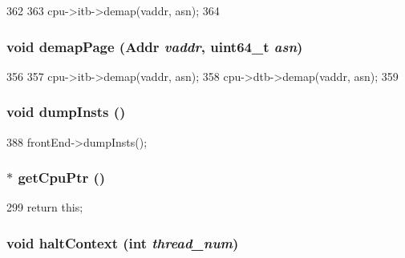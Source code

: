 \begin{DoxyCode}
362     {
363         cpu->itb->demap(vaddr, asn);
364     }
\end{DoxyCode}
\hypertarget{classOzoneCPU_a2d698ff909513b48a1263f8a5440e067}{
\subsubsection[{demapPage}]{\setlength{\rightskip}{0pt plus 5cm}void demapPage ({\bf Addr} {\em vaddr}, \/  uint64\_\-t {\em asn})}}
\label{classOzoneCPU_a2d698ff909513b48a1263f8a5440e067}



\begin{DoxyCode}
356     {
357         cpu->itb->demap(vaddr, asn);
358         cpu->dtb->demap(vaddr, asn);
359     }
\end{DoxyCode}
\hypertarget{classOzoneCPU_a80587b4fe043bbe1995536cb3b361588}{
\subsubsection[{dumpInsts}]{\setlength{\rightskip}{0pt plus 5cm}void dumpInsts ()}}
\label{classOzoneCPU_a80587b4fe043bbe1995536cb3b361588}



\begin{DoxyCode}
388 { frontEnd->dumpInsts(); }
\end{DoxyCode}
\hypertarget{classOzoneCPU_a4f35ce7d5cb2ec57504bc2c2bc03c879}{
\subsubsection[{getCpuPtr}]{$\ast$ getCpuPtr ()}}
\label{classOzoneCPU_a4f35ce7d5cb2ec57504bc2c2bc03c879}



\begin{DoxyCode}
299 { return this; }
\end{DoxyCode}
\hypertarget{classOzoneCPU_a2b63d5ec5d5563f38d63ab0ac6f937f3}{
\subsubsection[{haltContext}]{\setlength{\rightskip}{0pt plus 5cm}void haltContext (int {\em thread\_\-num})}}
\label{classOzoneCPU_a2b63d5ec5d5563f38d63ab0ac6f937f3}



